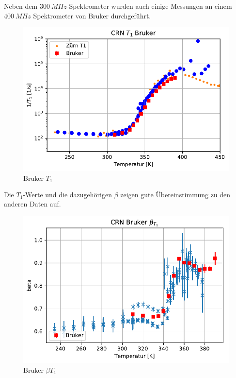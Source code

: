 Neben dem $\SI{300}{MHz}$-Spektrometer wurden auch einige Messungen an einem $\SI{400}{MHz}$ Spektrometer von Bruker durchgeführt.
\begin{figure}
	\begin{center}
		\includegraphics[width=\textwidth]{graphics/plots/BRUKER/bruker_t1.pdf}
	\end{center}
	\caption{Bruker $T_1$} \label{fig:res:bruker_t1}
\end{figure}
Die $T_1$-Werte und die dazugehörigen $\beta$ zeigen gute Übereinstimmung zu den anderen Daten auf.
\begin{figure}
	\begin{center}
		\includegraphics[width=\textwidth]{graphics/plots/BRUKER/bruker_t1beta.pdf}
	\end{center}
	\caption{Bruker $\beta{T_1}$} \label{fig:res:bruker_beta_t1}
\end{figure}

